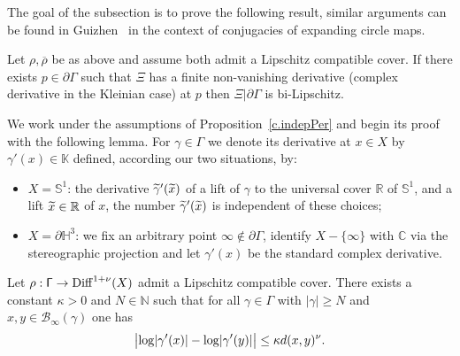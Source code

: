 \documentclass[AHL,Unicode,longabstracts,MathTools]{cedram}
\DeclareMathOperator{\Diff}{Diff}
\renewcommand{\sf}[1]{{\mathsf{#1}}}
\newcommand{\G}{\sf{\Gamma}}
\newcommand{\cal}{\mathcal}
\newcommand{\R}{\mathbb{R}}
\newcommand{\C}{\mathbb{C}}
\newcommand{\N}{\mathbb{N}}
\renewcommand{\H}{\mathbb{H}}
\newcommand{\K}{\mathbb{K}}
\newcommand{\bbS}{\mathbb{S}}
\newcommand{\g}{\gamma}
\newcommand{\bord}{\partial}
\newcommand{\ovrho}{\overline{\!\rho}}
\renewcommand{\/}{\backslash}
\newcommand{\<}{\langle}
\renewcommand{\>}{\rangle}
\renewcommand*{\to}{\mathchoice{\longrightarrow}{\rightarrow}{\rightarrow}{\rightarrow}}
\let\originalleft\left
\let\originalright\right
\renewcommand{\left}{\mathopen{}\mathclose\bgroup\originalleft}
\renewcommand{\right}{\aftergroup\egroup\originalright}
\let\oldtilde\tilde
\renewcommand*{\tilde}[1]{\mathchoice{\widetilde{#1}}{\widetilde{#1}}{\oldtilde{#1}}{\oldtilde{#1}}}
\begin{document}
The goal of the subsection is to prove the following result, similar arguments can be found in Guizhen~\cite{cui} in the context of conjugacies of expanding circle maps.


\begin{prop}\label{c.indepPer}
Let $\rho,\ovrho$ be as above and assume both admit a Lipschitz compatible cover. If there exists $p\in\bord\G$ such that $\Xi$ has a finite non-vanishing derivative (complex derivative in the Kleinian case) at $p$ then $\Xi|\bord\G$ is bi-Lipschitz.
\end{prop}



We work under the assumptions of Proposition~\ref{c.indepPer} and begin its proof with the following lemma. For $\g\in\G$ we denote its derivative at $x\in X$ by $\g'(x)\in\K$ defined, according our two situations, by:
\begin{itemize}
\item $X=\bbS^1$: the derivative $\tilde\g'(\tilde x)$ of a lift of $\g$ to the universal cover $\R$ of $\bbS^1$, and a lift $\tilde x\in\R$ of $x$, the number $\tilde \g'(\tilde x)$ is independent of these choices;
\item $X=\bord\H^3$: we fix an arbitrary point $\infty\notin\bord\G$, identify $X-\{\infty\}$ with $\C$ via the stereographic projection and let $\g'(x)$ be the standard complex derivative.
\end{itemize}


\begin{lemm}\label{controlC}
Let $\rho:\G\to\Diff^{1+\nu}(X)$ admit a Lipschitz compatible cover. There exists a constant $\kappa>0$ and $N\in\N$ such that for all $\g\in\G$ with $|\g|\geq N$ and $x,y\in\cal B_\infty(\g)$ one has
\[
\bigl\lvert\log\left|\g'(x)\right|-\log\left|\g'(y)\right|\bigr|\leq \kappa d(x,y)^\nu.
\]
\end{lemm}
\end{document}
